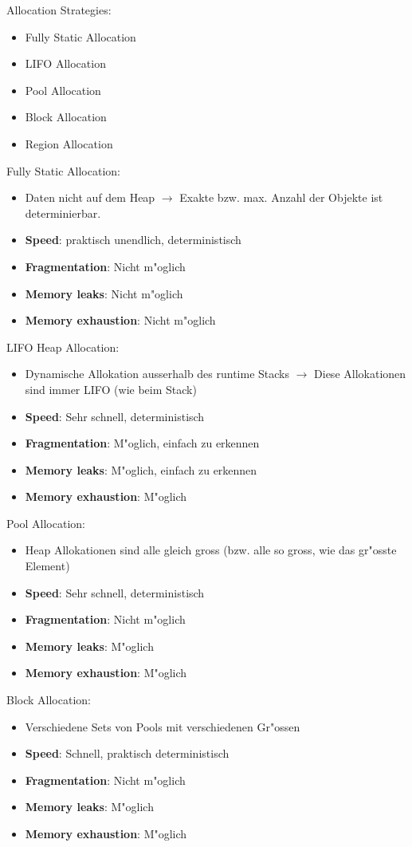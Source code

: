 Allocation Strategies: 
\begin{itemize}
\item Fully Static Allocation
\item LIFO Allocation
\item Pool Allocation
\item Block Allocation
\item Region Allocation
\end{itemize}

Fully Static Allocation: 
\begin{itemize}
\item Daten nicht auf dem Heap $\rightarrow$ Exakte bzw. max. Anzahl der Objekte ist determinierbar.
\item \textbf{Speed}: praktisch unendlich, deterministisch
\item \textbf{Fragmentation}: Nicht m"oglich
\item \textbf{Memory leaks}: Nicht m"oglich
\item \textbf{Memory exhaustion}: Nicht m"oglich
\end{itemize}

LIFO Heap Allocation: 
\begin{itemize}
\item Dynamische Allokation ausserhalb des runtime Stacks $\rightarrow$ Diese Allokationen sind immer LIFO (wie beim Stack)
\item \textbf{Speed}: Sehr schnell, deterministisch 
\item \textbf{Fragmentation}: M"oglich, einfach zu erkennen
\item \textbf{Memory leaks}: M"oglich, einfach zu erkennen
\item \textbf{Memory exhaustion}: M"oglich
\end{itemize}

Pool Allocation: 
\begin{itemize}
\item Heap Allokationen sind alle gleich gross (bzw. alle so gross, wie das gr"osste Element) 
\item \textbf{Speed}: Sehr schnell, deterministisch 
\item \textbf{Fragmentation}: Nicht m"oglich
\item \textbf{Memory leaks}: M"oglich
\item \textbf{Memory exhaustion}: M"oglich
\end{itemize}

Block Allocation: 
\begin{itemize}
\item Verschiedene Sets von Pools mit verschiedenen Gr"ossen 
\item \textbf{Speed}: Schnell, praktisch deterministisch 
\item \textbf{Fragmentation}: Nicht m"oglich
\item \textbf{Memory leaks}: M"oglich
\item \textbf{Memory exhaustion}: M"oglich
\end{itemize}

